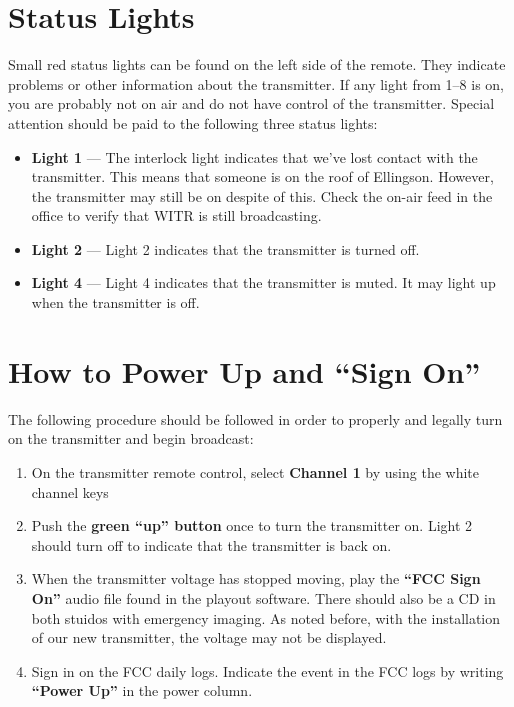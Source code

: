 \documentclass{witrman}
\begin{document}
\section{Status Lights}
Small red status lights can be found on the left side of the remote. They
indicate problems or other information about the transmitter. If any light from
1--8 is on, you are probably not on air and do not have control of the
transmitter. Special attention should be paid to the following three status
lights:
\begin{itemize}
    \item \textbf{Light 1} --- The interlock light indicates that we’ve lost
        contact with the transmitter. This means that someone is on the roof of
        Ellingson. However, the transmitter may still be on despite of this.
        Check the on-air feed in the office to verify that WITR is still
        broadcasting.
    \item \textbf{Light 2} --- Light 2 indicates that the transmitter is turned
        off.
    \item \textbf{Light 4} --- Light 4 indicates that the transmitter is muted.
        It may light up when the transmitter is off.
\end{itemize}

\section{How to Power Up and ``Sign On''}
The following procedure should be followed in order to properly and legally turn
on the transmitter and begin broadcast:
\begin{enumerate}
    \item On the transmitter remote control, select \textbf{Channel 1} by using
        the white channel keys
    \item Push the \textbf{green ``up'' button} once to turn the transmitter on.
        Light 2 should turn off to indicate that the transmitter is back on.
    \item When the transmitter voltage has stopped moving, play the
        \textbf{``FCC Sign On''} audio file found in the playout software. There
        should also be a CD in both stuidos with emergency imaging. As noted
        before, with the installation of our new transmitter, the voltage may
        not be displayed.
    \item Sign in on the FCC daily logs. Indicate the event in the FCC logs by
        writing \textbf{``Power Up''} in the power column.
\end{enumerate}
\end{document}
